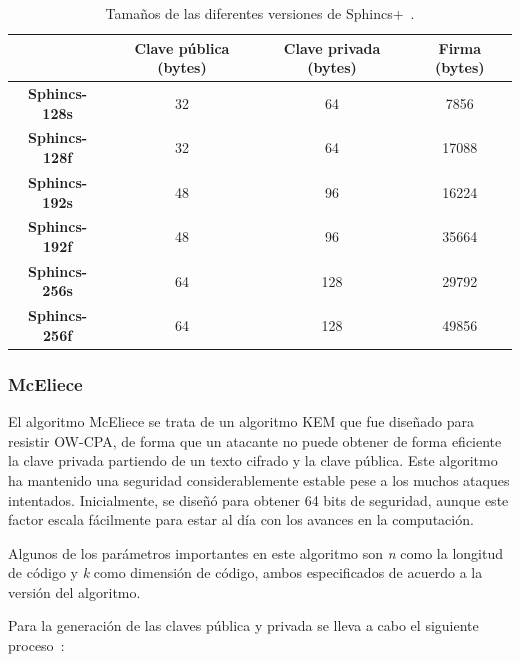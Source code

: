 \begin{table}[H]
    \centering
    \begin{tabular}{|c|c|c|c|}
    \hline
                            & Clave pública (bytes) & Clave privada (bytes) & Firma (bytes) \\ \hline
    \textbf{Sphincs-128s}   & 32                    & 64                    & 7856          \\ \hline
    \textbf{Sphincs-128f}   & 32                    & 64                    & 17088         \\ \hline
    \textbf{Sphincs-192s}   & 48                    & 96                    & 16224         \\ \hline
    \textbf{Sphincs-192f}   & 48                    & 96                    & 35664         \\ \hline
    \textbf{Sphincs-256s}   & 64                    & 128                   & 29792         \\ \hline
    \textbf{Sphincs-256f}   & 64                    & 128                   & 49856         \\ \hline
    \end{tabular}
    \caption{Tamaños de las diferentes versiones de Sphincs+~\cite{sphincs_spec}.}
    \label{tab:sphincs}
\end{table}


\subsubsection{McEliece}\label{subsubsec:mceliece}

El algoritmo McEliece se trata de un algoritmo \ac{KEM} que fue diseñado para resistir \ac{OW-CPA}, de forma que un atacante no puede obtener de forma eficiente la clave privada partiendo de un texto cifrado y la clave pública.
Este algoritmo ha mantenido una seguridad considerablemente estable pese a los muchos ataques intentados.
Inicialmente, se diseñó para obtener 64 bits de seguridad, aunque este factor escala fácilmente para estar al día con los avances en la computación.

Algunos de los parámetros importantes en este algoritmo son \textit{n} como la longitud de código y \textit{k} como dimensión de código, ambos especificados de acuerdo a la versión del algoritmo.

Para la generación de las claves pública y privada se lleva a cabo el siguiente proceso~\cite{mceliece_spec}:

